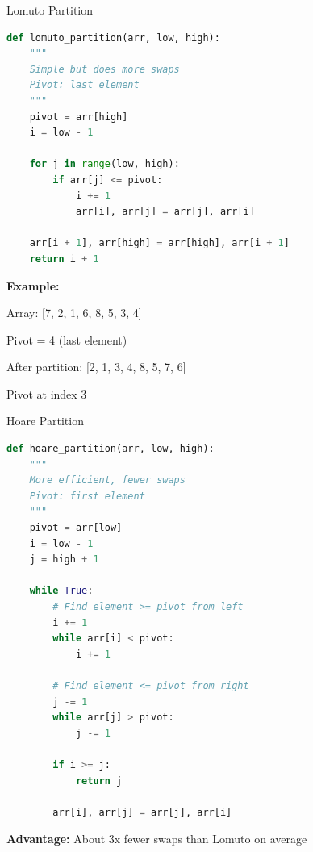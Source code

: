 \documentclass[aspectratio=169]{beamer}
\begin{document}
\begin{frame}[fragile]{Lomuto Partition}
\begin{lstlisting}[language=Python, basicstyle=\ttfamily\tiny]
def lomuto_partition(arr, low, high):
    """
    Simple but does more swaps
    Pivot: last element
    """
    pivot = arr[high]
    i = low - 1

    for j in range(low, high):
        if arr[j] <= pivot:
            i += 1
            arr[i], arr[j] = arr[j], arr[i]

    arr[i + 1], arr[high] = arr[high], arr[i + 1]
    return i + 1
\end{lstlisting}

\vspace{0.2cm}
\textbf{Example:}
\begin{center}
Array: [7, 2, 1, 6, 8, 5, 3, 4]

Pivot = 4 (last element)

After partition: [2, 1, 3, 4, 8, 5, 7, 6]

Pivot at index 3
\end{center}
\end{frame}

\begin{frame}[fragile]{Hoare Partition}
\begin{lstlisting}[language=Python, basicstyle=\ttfamily\tiny]
def hoare_partition(arr, low, high):
    """
    More efficient, fewer swaps
    Pivot: first element
    """
    pivot = arr[low]
    i = low - 1
    j = high + 1

    while True:
        # Find element >= pivot from left
        i += 1
        while arr[i] < pivot:
            i += 1

        # Find element <= pivot from right
        j -= 1
        while arr[j] > pivot:
            j -= 1

        if i >= j:
            return j

        arr[i], arr[j] = arr[j], arr[i]
\end{lstlisting}

\textbf{Advantage:} About 3x fewer swaps than Lomuto on average
\end{frame}
\end{document}
